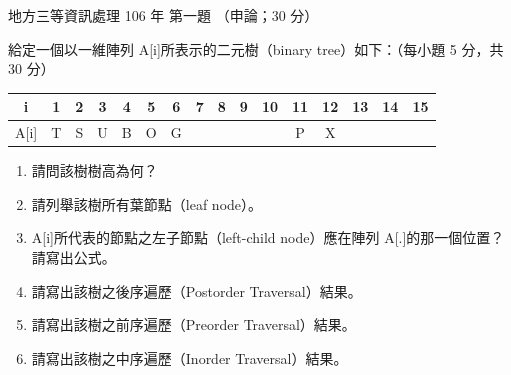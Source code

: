 \begin{pastexam}[label={px:df3-106-ds-01}]{地方三等資訊處理 106 年 第一題}
（申論；30 分）

給定一個以一維陣列 A[i]所表示的二元樹（binary tree）如下：（每小題 5 分，共 30 分）
\begin{center}
\begin{tabular}{|c|*{15}{c|}}
\hline
i & 1 & 2 & 3 & 4 & 5 & 6 & 7 & 8 & 9 & 10 & 11 & 12 & 13 & 14 & 15 \\
\hline
A[i] & T & S & U & B & O & G & & & & & P & X & & & \\
\hline
\end{tabular}
\end{center}
\begin{enumerate}[leftmargin=2.2em]
\item[㈠] 請問該樹樹高為何？
\item[㈡] 請列舉該樹所有葉節點（leaf node）。
\item[㈢] A[i]所代表的節點之左子節點（left-child node）應在陣列 A[.]的那一個位置？請寫出公式。
\item[㈣] 請寫出該樹之後序遍歷（Postorder Traversal）結果。
\item[㈤] 請寫出該樹之前序遍歷（Preorder Traversal）結果。
\item[㈥] 請寫出該樹之中序遍歷（Inorder Traversal）結果。
\end{enumerate}
\end{pastexam}

